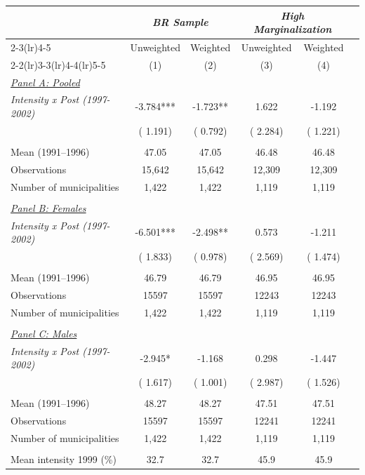 \begin{tabular}{lccccc} \hline \hline
& \multicolumn{2}{c}{\textit{BR Sample}} 
& \multicolumn{2}{c}{\textit{High Marginalization}} \\ \cmidrule(lr){2-3}\cmidrule(lr){4-5}
& \multicolumn{1}{c}{Unweighted} & \multicolumn{1}{c}{Weighted} & \multicolumn{1}{c}{Unweighted} & \multicolumn{1}{c}{Weighted} \\ 
\cmidrule(lr){2-2}\cmidrule(lr){3-3}\cmidrule(lr){4-4}\cmidrule(lr){5-5}
& \multicolumn{1}{c}{(1)} & \multicolumn{1}{c}{(2)} & \multicolumn{1}{c}{(3)} & \multicolumn{1}{c}{(4)} \\ \toprule
\underline{\textit{Panel A: Pooled}} \\ 
\textit{Intensity x Post (1997-2002)}&    -3.784***&    -1.723**&     1.622&    -1.192 \\ 
 & (    1.191)& (    0.792)& (    2.284)& (    1.221) \\ 
  & & & & \\ 
Mean (1991--1996)&     47.05&     47.05&     46.48&     46.48 \\ 
Observations&     15,642&     15,642&     12,309&     12,309 \\ 
Number of municipalities&      1,422&      1,422&      1,119&      1,119 \\ 
  & & & & \\ 
\underline{\textit{Panel B: Females}} \\ 
\textit{Intensity x Post (1997-2002)}&    -6.501***&    -2.498**&     0.573&    -1.211 \\ 
 & (    1.833)& (    0.978)& (    2.569)& (    1.474) \\ 
  & & & & \\ 
Mean (1991--1996)&     46.79&     46.79&     46.95&     46.95 \\ 
Observations&     15597&     15597&     12243&     12243 \\ 
Number of municipalities&      1,422&      1,422&      1,119&      1,119 \\ 
  & & & & \\ 
\underline{\textit{Panel C: Males}} \\ 
\textit{Intensity x Post (1997-2002)}&    -2.945*&    -1.168&     0.298&    -1.447 \\ 
 & (    1.617)& (    1.001)& (    2.987)& (    1.526) \\ 
  & & & & \\ 
Mean (1991--1996)&     48.27&     48.27&     47.51&     47.51 \\ 
Observations&     15597&     15597&     12241&     12241 \\ 
Number of municipalities&      1,422&      1,422&      1,119&      1,119 \\ 
  & & & & \\ 
Mean intensity 1999 (\%) &   32.7 &   32.7 &   45.9 &   45.9 \\ 
\bottomrule
\end{tabular}